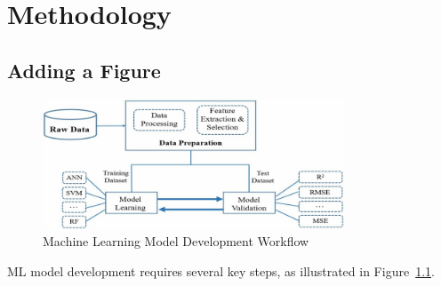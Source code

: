 \chapter{Methodology}
\vspace{2em}
\section{Adding a Figure}


\begin{figure}[H]
    \centering
    \includegraphics[width=0.8\textwidth]{Figures/Fig:ML-workflow.png}
    \caption{Machine Learning Model Development Workflow}
    \label{fig:ml-workflow}
\end{figure}





ML model development requires several key steps, as illustrated in Figure~\ref{fig:ml-workflow}.